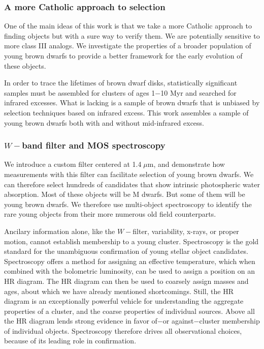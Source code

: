 \subsubsection{A more Catholic approach to selection}
One of the main ideas of this work is that we take a more Catholic approach to finding objects but with a sure way to verify them.  We are potentially sensitive to more class III analogs.  We investigate the properties of a broader population of young brown dwarfs to provide a better framework for the early evolution of these objects.

In order to trace the lifetimes of brown dwarf disks, statistically significant samples must be assembled for clusters of ages 1$-$10 Myr and searched for infrared excesses.  What is lacking is a sample of brown dwarfs that is unbiased by selection techniques based on infrared excess.  This work assembles a sample of young brown dwarfs both with and without mid-infrared excess.

\subsubsection{ $W-$band filter and MOS spectroscopy}
We introduce a custom filter centered at 1.4$\;\mu$m, and demonstrate how measurements with this filter can facilitate selection of young brown dwarfs.  We can therefore select hundreds of candidates that show intrinsic photospheric water absorption.  Most of these objects will be M dwarfs.  But some of them will be young brown dwarfs.  We therefore use multi-object spectroscopy to identify the rare young objects from their more numerous old field counterparts.

Ancilary information alone, like the $W-$filter, variability, x-rays, or proper motion, cannot establish membership to a young cluster.  Spectroscopy is the gold standard for the unambiguous confirmation of young stellar object candidates.  Spectroscopy offers a method for assigning an effective temperature, which when combined with the bolometric luminosity, can be used to assign a position on an HR diagram.  The HR diagram can then be used to coarsely assign masses and ages, about which we have already mentioned shortcomings.  Still, the HR diagram is an exceptionally powerful vehicle for understanding the aggregate properties of a cluster, and the coarse properties of individual sources.  Above all the HR diagram lends strong evidence in favor of$-$or against$-$cluster membership of individual objects.  Spectroscopy therefore drives all observational choices, because of its leading role in confirmation.

